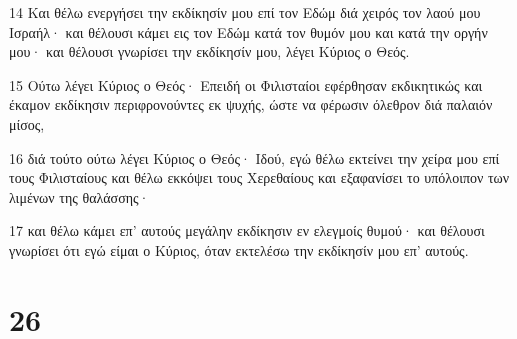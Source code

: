 \par 14 Και θέλω ενεργήσει την εκδίκησίν μου επί τον Εδώμ διά χειρός τον λαού μου Ισραήλ· και θέλουσι κάμει εις τον Εδώμ κατά τον θυμόν μου και κατά την οργήν μου· και θέλουσι γνωρίσει την εκδίκησίν μου, λέγει Κύριος ο Θεός.
\par 15 Ούτω λέγει Κύριος ο Θεός· Επειδή οι Φιλισταίοι εφέρθησαν εκδικητικώς και έκαμον εκδίκησιν περιφρονούντες εκ ψυχής, ώστε να φέρωσιν όλεθρον διά παλαιόν μίσος,
\par 16 διά τούτο ούτω λέγει Κύριος ο Θεός· Ιδού, εγώ θέλω εκτείνει την χείρα μου επί τους Φιλισταίους και θέλω εκκόψει τους Χερεθαίους και εξαφανίσει το υπόλοιπον των λιμένων της θαλάσσης·
\par 17 και θέλω κάμει επ' αυτούς μεγάλην εκδίκησιν εν ελεγμοίς θυμού· και θέλουσι γνωρίσει ότι εγώ είμαι ο Κύριος, όταν εκτελέσω την εκδίκησίν μου επ' αυτούς.

\chapter{26}

